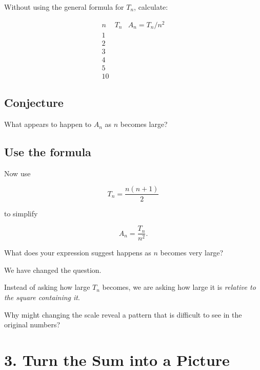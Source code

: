 \documentclass[11pt]{article}
\begin{document}
Without using the general formula for \(T_n\), calculate:

\[
\begin{array}{c|c|c}
n & T_n & A_n=T_n/n^2\\
\hline
1 & &\\[0.12in]
2 & &\\[0.12in]
3 & &\\[0.12in]
4 & &\\[0.12in]
5 & &\\[0.12in]
10 & &
\end{array}
\]


\subsection*{Conjecture}

What appears to happen to \(A_n\) as \(n\) becomes large?

\vspace{0.55in}


\subsection*{Use the formula}

Now use

\[
T_n=\frac{n(n+1)}{2}
\]

to simplify

\[
A_n=\frac{T_n}{n^2}.
\]

\vspace{0.65in}

What does your expression suggest happens as \(n\) becomes very large?

\vspace{0.5in}


\begin{reflection}
We have changed the question.

Instead of asking how large \(T_n\) becomes, we are asking how large it
is \emph{relative to the square containing it}.

Why might changing the scale reveal a pattern that is difficult to see
in the original numbers?
\end{reflection}


\newpage
\section{3. Turn the Sum into a Picture}
\end{document}
